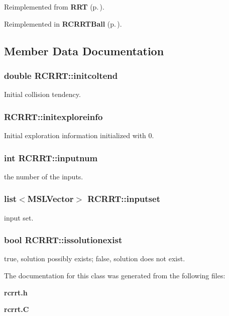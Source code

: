Reimplemented from {\bf RRT} {\rm (p.\,\pageref{classRRT_b1})}.

Reimplemented in {\bf RCRRTBall} {\rm (p.\,\pageref{classRCRRTBall_a2})}.

\subsection{Member Data Documentation}
\subsubsection{\setlength{\rightskip}{0pt plus 5cm}double RCRRT::initcoltend}\label{classRCRRT_m4}


Initial collision tendency.

\subsubsection{ RCRRT::initexploreinfo}\label{classRCRRT_m3}


Initial exploration information initialized with 0.

\subsubsection{\setlength{\rightskip}{0pt plus 5cm}int RCRRT::inputnum}\label{classRCRRT_m0}


the number of the inputs.

\subsubsection{\setlength{\rightskip}{0pt plus 5cm}list$<${\bf MSLVector}$>$ RCRRT::inputset}\label{classRCRRT_m1}


input set.

\subsubsection{\setlength{\rightskip}{0pt plus 5cm}bool RCRRT::issolutionexist}\label{classRCRRT_m2}


true, solution possibly exists; false, solution does not exist.



The documentation for this class was generated from the following files:\begin{CompactItemize}
\item 
{\bf rcrrt.h}\item 
{\bf rcrrt.C}\end{CompactItemize}

